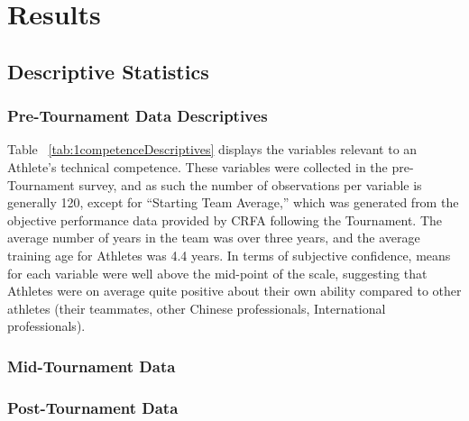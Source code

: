 {\section{Results\label{app8:results}}



\subsection{Descriptive Statistics}

\subsubsection{Pre-Tournament Data Descriptives \label{app8:descriptivesPre}}



Table ~\ref{tab:1competenceDescriptives} displays the variables relevant to an Athlete's technical competence.  These variables were collected in the pre-Tournament survey, and as such the number of observations per variable is generally 120, except for ``Starting Team Average,'' which was generated from the objective performance data provided by CRFA following the Tournament.  The average number of years in the team was over three years, and the average training age for Athletes was 4.4 years.  In terms of subjective confidence, means for each variable were well above the mid-point of the scale, suggesting that Athletes were on average quite positive about their own ability compared to other athletes (their teammates, other Chinese professionals, International professionals).

\subsubsection{Mid-Tournament Data}



\subsubsection{Post-Tournament Data}




%









}
